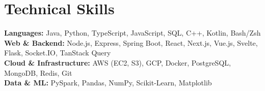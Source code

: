 \documentclass[letterpaper,11pt]{article}
\begin{document}
\section{Technical Skills}
\begin{itemize}[leftmargin=0.0in, label={}, topsep=0pt, parsep=0pt, itemsep=2pt]
    \small{\item{
        \textbf{Languages:} Java, Python, TypeScript, JavaScript, SQL, C++, Kotlin, Bash/Zsh \\
        \textbf{Web \& Backend:} Node.js, Express, Spring Boot, React, Next.js, Vue.js, Svelte, Flask, Socket.IO, TanStack Query \\
        \textbf{Cloud \& Infrastructure:} AWS (EC2, S3), GCP, Docker, PostgreSQL, MongoDB, Redis, Git \\
        \textbf{Data \& ML:} PySpark, Pandas, NumPy, Scikit-Learn, Matplotlib
    }}
\end{itemize}
\end{document}
